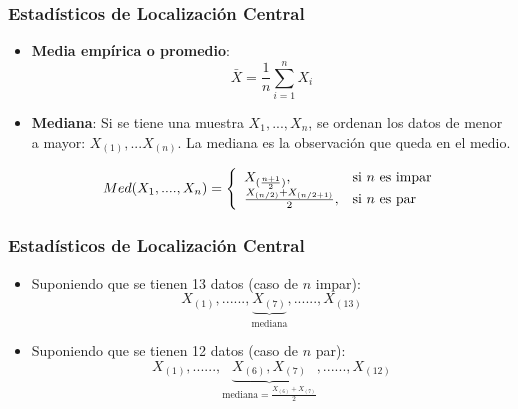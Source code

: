 \documentclass{beamer}
\begin{document}
\begin{frame}
\frametitle{Estadísticos de Localización  Central}

\begin{itemize}
\item \textbf{{\color{blue}Media empírica o promedio}}:
$$\bar{X}=\frac{1}{n}\sum_{i=1}^n X_i$$


\item \textbf{{\color{blue}Mediana}}: Si se tiene una muestra $X_1,...,X_n$, se ordenan los datos de menor a mayor:
$X_{(1)},...X_{(n)}$. La mediana es la observación que queda en el
medio.

$$Med(X_1,....,X_n)=\left\{
                      \begin{array}{ll}
                        X_{(\frac{n+1}{2})}, & \hbox{si $n$ es impar} \\
                        \frac{X_{(n/2)}+X_{(n/2+1)}}{2}, & \hbox{si $n$ es par}
                      \end{array}
                    \right.
$$
\end{itemize}
\end{frame}







\begin{frame}
\frametitle{Estadísticos de Localización  Central}

\begin{itemize}
\item Suponiendo que se tienen 13 datos (caso de $n$ impar): $$X_{(1)},......,\underbrace{X_{(7)}}_\text{mediana},......,X_{(13)}$$

\item Suponiendo que se tienen 12 datos (caso de $n$ par): $$X_{(1)},......,\underbrace{X_{(6)},X_{(7)}}_\text{mediana$=\frac{X_{(6)}+X_{(7)}}{2}$},......,X_{(12)}$$
\end{itemize}
\end{frame}
\end{document}
